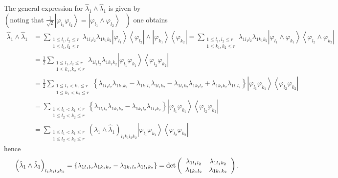\documentclass[aps,preprint]{revtex4}%
\begin{document}
The general expression for $\hat{\lambda}_{1}\wedge\hat{\lambda}_{1}$ is given
by $\left(  \text{noting that }\frac{1}{\sqrt{2}}\left\vert \varphi_{l_{1}%
}\varphi_{l_{2}}\right\rangle =\left\vert \varphi_{l_{1}}\wedge\varphi_{l_{2}%
}\right\rangle \text{ }\right)  $ one obtains
\begin{align*}
\hat{\lambda}_{1}\wedge\hat{\lambda}_{1}  &  =\sum_{\substack{1\leq
l_{1},l_{2}\leq r\\1\leq l_{1},l_{2}\leq r}}\lambda_{1l_{1}l_{2}}%
\lambda_{1k_{1}k_{2}}\left\vert \varphi_{l_{1}}\right\rangle \left\langle
\varphi_{l_{2}}\right\vert \wedge\left\vert \varphi_{k_{1}}\right\rangle
\left\langle \varphi_{k_{2}}\right\vert =\sum_{\substack{1\leq l_{1},l_{2}\leq
r\\1\leq k_{1},k_{2}\leq r}}\lambda_{1l_{1}l_{2}}\lambda_{1k_{1}k_{2}%
}\left\vert \varphi_{l_{1}}\wedge\varphi_{k_{1}}\right\rangle \left\langle
\varphi_{l_{2}}\wedge\varphi_{k_{2}}\right\vert \\
&  =\frac{1}{2}\sum_{\substack{1\leq l_{1},l_{2}\leq r\\1\leq k_{1},k_{2}\leq
r}}\lambda_{1l_{1}l_{2}}\lambda_{1k_{1}k_{2}}\left\vert \varphi_{l_{1}}%
\varphi_{k_{1}}\right\rangle \left\langle \varphi_{l_{2}}\varphi_{k_{2}%
}\right\vert \\
&  =\frac{1}{2}\sum_{\substack{1\leq l_{1}<k_{1}\leq r\\1\leq k_{1}<k_{2}\leq
r}}\left\{  \lambda_{1l_{1}l_{2}}\lambda_{1k_{1}k_{2}}-\lambda_{1k_{1}l_{2}%
}\lambda_{1l_{1}k_{2}}-\lambda_{1l_{1}k_{2}}\lambda_{1k_{1}l_{2}}%
+\lambda_{1k_{1}k_{2}}\lambda_{1l_{1}l_{2}}\right\}  \left\vert \varphi
_{l_{1}}\varphi_{k_{1}}\right\rangle \left\langle \varphi_{l_{2}}%
\varphi_{k_{2}}\right\vert \\
&  =\sum_{\substack{1\leq l_{1}<k_{1}\leq r\\1\leq l_{2}<k_{2}\leq r}}\left\{
\lambda_{1l_{1}l_{2}}\lambda_{1k_{1}k_{2}}-\lambda_{1k_{1}l_{2}}%
\lambda_{1l_{1}k_{2}}\right\}  \left\vert \varphi_{l_{1}}\varphi_{k_{1}%
}\right\rangle \left\langle \varphi_{l_{2}}\varphi_{k_{2}}\right\vert \\
&  =\sum_{\substack{1\leq l_{1}<k_{1}\leq r\\1\leq l_{2}<k_{2}\leq r}}\left(
\hat{\lambda}_{1}\wedge\hat{\lambda}_{1}\right)  _{l_{1}k_{1}l_{2}k_{2}%
}\left\vert \varphi_{l_{1}}\varphi_{k_{1}}\right\rangle \left\langle
\varphi_{l_{2}}\varphi_{k_{2}}\right\vert
\end{align*}
hence
\[
\left(  \hat{\lambda}_{1}\wedge\hat{\lambda}_{1}\right)  _{l_{1}k_{1}%
l_{2}k_{2}}=\left\{  \lambda_{1l_{1}l_{2}}\lambda_{1k_{1}k_{2}}-\lambda
_{1k_{1}l_{2}}\lambda_{1l_{1}k_{2}}\right\}  =\det\left(
\begin{array}
[c]{cc}%
\lambda_{1l_{1}l_{2}} & \lambda_{1l_{1}k_{2}}\\
\lambda_{1k_{1}l_{2}} & \lambda_{1k_{1}k_{2}}%
\end{array}
\right)  .
\]
\end{document}
